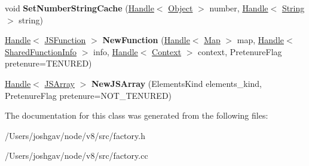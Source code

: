 \begin{DoxyCompactItemize}
\item 
void {\bfseries Set\+Number\+String\+Cache} (\hyperlink{classv8_1_1internal_1_1_handle}{Handle}$<$ \hyperlink{classv8_1_1internal_1_1_object}{Object} $>$ number, \hyperlink{classv8_1_1internal_1_1_handle}{Handle}$<$ \hyperlink{classv8_1_1internal_1_1_string}{String} $>$ string)\hypertarget{classv8_1_1internal_1_1_factory_a18ac79db9ae7b8ee52af6dc34c9295cd}{}\label{classv8_1_1internal_1_1_factory_a18ac79db9ae7b8ee52af6dc34c9295cd}

\item 
\hyperlink{classv8_1_1internal_1_1_handle}{Handle}$<$ \hyperlink{classv8_1_1internal_1_1_j_s_function}{J\+S\+Function} $>$ {\bfseries New\+Function} (\hyperlink{classv8_1_1internal_1_1_handle}{Handle}$<$ \hyperlink{classv8_1_1internal_1_1_map}{Map} $>$ map, \hyperlink{classv8_1_1internal_1_1_handle}{Handle}$<$ \hyperlink{classv8_1_1internal_1_1_shared_function_info}{Shared\+Function\+Info} $>$ info, \hyperlink{classv8_1_1internal_1_1_handle}{Handle}$<$ \hyperlink{classv8_1_1internal_1_1_context}{Context} $>$ context, Pretenure\+Flag pretenure=T\+E\+N\+U\+R\+ED)\hypertarget{classv8_1_1internal_1_1_factory_a08802837da99ec70212906fc868ad4d8}{}\label{classv8_1_1internal_1_1_factory_a08802837da99ec70212906fc868ad4d8}

\item 
\hyperlink{classv8_1_1internal_1_1_handle}{Handle}$<$ \hyperlink{classv8_1_1internal_1_1_j_s_array}{J\+S\+Array} $>$ {\bfseries New\+J\+S\+Array} (Elements\+Kind elements\+\_\+kind, Pretenure\+Flag pretenure=N\+O\+T\+\_\+\+T\+E\+N\+U\+R\+ED)\hypertarget{classv8_1_1internal_1_1_factory_ad6be1b7472261cfad312935aeb3cf90d}{}\label{classv8_1_1internal_1_1_factory_ad6be1b7472261cfad312935aeb3cf90d}

\end{DoxyCompactItemize}


The documentation for this class was generated from the following files\+:\begin{DoxyCompactItemize}
\item 
/\+Users/joshgav/node/v8/src/factory.\+h\item 
/\+Users/joshgav/node/v8/src/factory.\+cc\end{DoxyCompactItemize}
